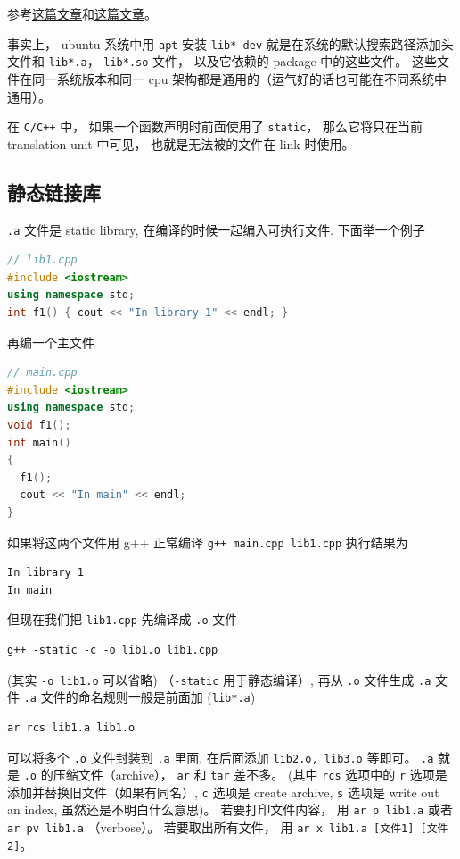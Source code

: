 

参考\href{https://blog.feabhas.com/2014/04/static-and-dynamic-libraries-on-linux/}{这篇文章}和\href{https://gcc.gnu.org/onlinedocs/gcc/Link-Options.html}{这篇文章}。

事实上， ubuntu 系统中用 \verb`apt` 安装 \verb`lib*-dev` 就是在系统的默认搜索路径添加头文件和 \verb`lib*.a`， \verb`lib*.so` 文件， 以及它依赖的 package 中的这些文件。 这些文件在同一系统版本和同一 cpu 架构都是通用的（运气好的话也可能在不同系统中通用）。

在 \verb`C/C++` 中， 如果一个函数声明时前面使用了 \verb`static`， 那么它将只在当前 translation unit 中可见， 也就是无法被的文件在 link 时使用。


\subsection{静态链接库}

\verb`.a` 文件是 static library, 在编译的时候一起编入可执行文件. 下面举一个例子

\begin{lstlisting}[language=cpp]
// lib1.cpp
#include <iostream>
using namespace std;
int f1() { cout << "In library 1" << endl; }
\end{lstlisting}

再编一个主文件

\begin{lstlisting}[language=cpp]
// main.cpp
#include <iostream>
using namespace std;
void f1();
int main()
{
  f1();
  cout << "In main" << endl;
}
\end{lstlisting}

如果将这两个文件用 g++ 正常编译 \verb`g++ main.cpp lib1.cpp` 执行结果为
\begin{lstlisting}[language=none]
In library 1
In main
\end{lstlisting}
但现在我们把 \verb`lib1.cpp` 先编译成 \verb`.o` 文件

\begin{lstlisting}[language=none]
g++ -static -c -o lib1.o lib1.cpp
\end{lstlisting}

(其实 \verb`-o lib1.o` 可以省略) （\verb`-static` 用于静态编译）, 再从 \verb`.o` 文件生成 \verb`.a` 文件 \verb`.a` 文件的命名规则一般是前面加 (\verb`lib*.a`)

\begin{lstlisting}[language=none]
ar rcs lib1.a lib1.o
\end{lstlisting}
可以将多个 \verb`.o` 文件封装到 \verb`.a` 里面, 在后面添加 \verb`lib2.o, lib3.o` 等即可。 \verb`.a` 就是 \verb`.o` 的压缩文件（archive）， \verb`ar` 和 \verb`tar` 差不多。 (其中 \verb`rcs` 选项中的 \verb`r` 选项是添加并替换旧文件（如果有同名）, \verb`c` 选项是 create archive, \verb`s` 选项是 write out an index, 虽然还是不明白什么意思)。 若要打印文件内容， 用 \verb`ar p lib1.a` 或者 \verb`ar pv lib1.a` （verbose）。 若要取出所有文件， 用 \verb`ar x lib1.a [文件1] [文件2]`。

